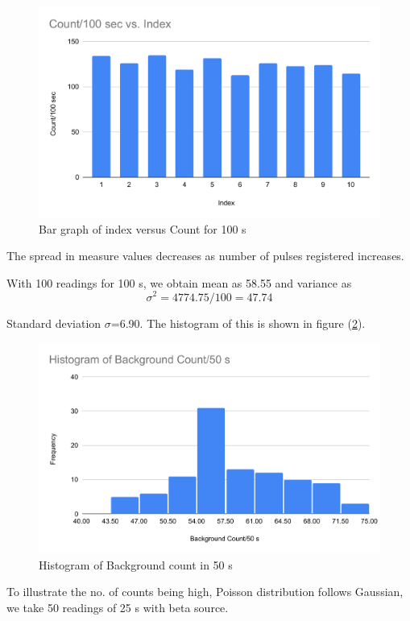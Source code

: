 \documentclass[a4paper, amsfonts, amssymb, amsmath, reprint, showkeys, nofootinbib, twoside]{revtex4-1}
\begin{document}
\begin{figure}[H]
	\centering
	\includegraphics[scale=0.4]{100} 
	\caption{Bar graph of index versus Count for 100 s}
	\label{100}
\end{figure}
 The spread in measure values decreases as number of pulses registered increases.
 
 With 100 readings for 100 s, we obtain mean as 58.55 and variance as 
 \begin{equation}
 	\sigma^2=4774.75/100=47.74
 \end{equation}

Standard deviation $\sigma$=6.90. The histogram of this is shown in figure (\ref{h1}).

\begin{figure}[H]
	\centering
	\includegraphics[scale=0.4]{50} 
	\caption{Histogram of Background count in 50 s}
	\label{h1}
\end{figure}

To illustrate the no. of counts being high, Poisson distribution follows Gaussian, we take 50 readings of 25 s with beta source.
\end{document}
